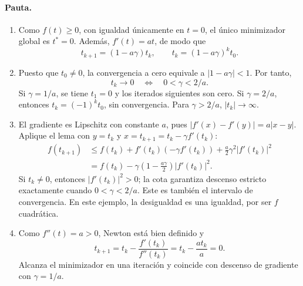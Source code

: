 \documentclass[a4paper,12 pt]{article}
\theoremstyle{definition}
\begin{document}
\paragraph{Pauta.}
\begin{enumerate}
    \item Como $f(t)\geq0$, con igualdad únicamente en $t=0$, el único
    minimizador global es $t^*=0$. Además, $f'(t)=at$, de modo que
    \[
    t_{k+1}=(1-a\gamma)t_k,
    \qquad \boxed{t_k=(1-a\gamma)^k t_0.}
    \]
    \item Puesto que $t_0\neq0$, la convergencia a cero equivale a
    $|1-a\gamma|<1$. Por tanto,
    \[
    \boxed{t_k\longrightarrow0\quad\Longleftrightarrow\quad 0<\gamma<2/a.}
    \]
    Si $\gamma=1/a$, se tiene $t_1=0$ y los iterados siguientes son cero.
    Si $\gamma=2/a$, entonces $t_k=(-1)^k t_0$, sin convergencia.
    Para $\gamma>2/a$, $|t_k|\to\infty$.
    \item El gradiente es Lipschitz con constante $a$, pues
    $|f'(x)-f'(y)|=a|x-y|$. Aplique el lema con $y=t_k$ y
    $x=t_{k+1}=t_k-\gamma f'(t_k)$:
    \begin{align*}
    f(t_{k+1})
    &\leq f(t_k)+f'(t_k)(-\gamma f'(t_k))
    +\frac a2\gamma^2|f'(t_k)|^2\\
    &=f(t_k)-\gamma\left(1-\frac{a\gamma}{2}\right)|f'(t_k)|^2.
    \end{align*}
    Si $t_k\neq0$, entonces $|f'(t_k)|^2>0$; la cota garantiza
    descenso estricto exactamente cuando $0<\gamma<2/a$.
    Este es también el intervalo de convergencia. En este ejemplo,
    la desigualdad es una igualdad, por ser $f$ cuadrática.
    \item Como $f''(t)=a>0$, Newton está bien definido y
    \[
    \boxed{t_{k+1}=t_k-\frac{f'(t_k)}{f''(t_k)}
    =t_k-\frac{at_k}{a}=0.}
    \]
    Alcanza el minimizador en una iteración y coincide con descenso
    de gradiente con $\gamma=1/a$.
\end{enumerate}
\end{document}
